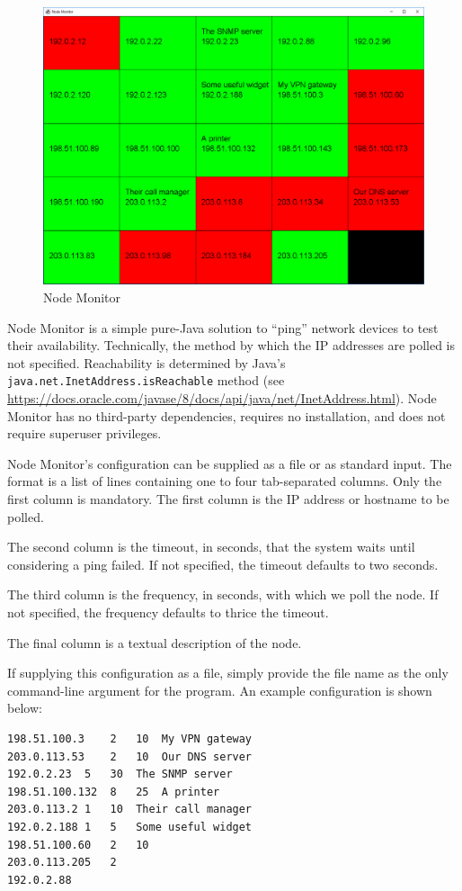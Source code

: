 \documentclass[12pt]{article}
\begin{document}
\begin{figure}[h]
\centering
\includegraphics[width=.80\textwidth]{Node-Monitor}
\caption{Node Monitor}
\label{fig:Node-Monitor}
\end{figure}

Node Monitor is a simple pure-Java solution to ``ping'' network devices to test their availability. Technically, the method by which the IP addresses are polled is not specified. Reachability is determined by Java's \texttt{java.net.InetAddress.isReachable} method (see \url{https://docs.oracle.com/javase/8/docs/api/java/net/InetAddress.html}). Node Monitor has no third-party dependencies, requires no installation, and does not require superuser privileges.

Node Monitor's configuration can be supplied as a file or as standard input. The format is a list of lines containing one to four tab-separated columns. Only the first column is mandatory. The first column is the IP address or hostname to be polled.

The second column is the timeout, in seconds, that the system waits until considering a ping failed. If not specified, the timeout defaults to two seconds.

The third column is the frequency, in seconds, with which we poll the node. If not specified, the frequency defaults to thrice the timeout.

The final column is a textual description of the node.

If supplying this configuration as a file, simply provide the file name as the only command-line argument for the program. An example configuration is shown below:

\begin{lstlisting}
198.51.100.3	2	10	My VPN gateway
203.0.113.53	2	10	Our DNS server
192.0.2.23	5	30	The SNMP server
198.51.100.132	8	25	A printer
203.0.113.2	1	10	Their call manager
192.0.2.188	1	5	Some useful widget
198.51.100.60	2	10
203.0.113.205	2
192.0.2.88
\end{lstlisting}
\end{document}
